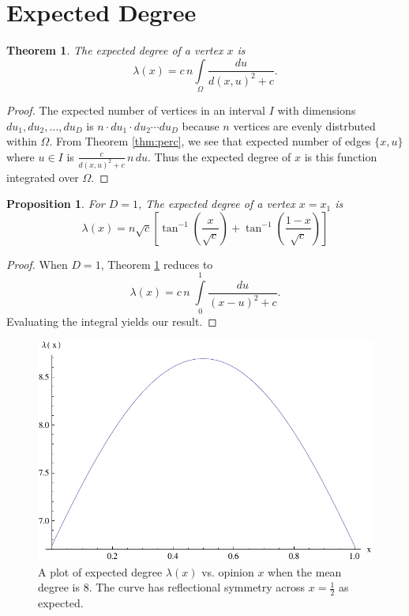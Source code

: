 \documentclass[a4paper,10pt]{article}
\newtheorem{prop}{Proposition}
\newtheorem{theorem}{Theorem}
\begin{document}
\section{Expected Degree}
\begin{theorem}
\label{thm:lambdax}
The expected degree of a vertex $x$ is
 \begin{equation}
 \lambda(x) = c\,n\int\limits_\Omega \frac{du}{d(x, u)^2 + c}.
\end{equation}
\end{theorem}
\begin{proof}
The expected number of vertices in an interval $I$ with dimensions $du_1, du_2, \ldots, du_D$  is $n \cdot du_1 \cdot du_2 \cdots du_D$ because $n$ vertices are evenly distrbuted within $\Omega$. From Theorem \ref{thm:perc}, we see that expected number of edges $\{x, u\}$ where $u \in I$ is $\frac{c}{d(x, u)^2 + c} \, n \, du$. Thus the expected degree of $x$ is this function integrated over $\Omega$.
\end{proof}

\begin{prop}
For $D = 1$, The expected degree of a vertex $x = x_1$ is
 \begin{equation}
 \lambda(x) = n\sqrt{c}\left[\tan^{-1}\left(\frac{x}{\sqrt{c}}\right)+\tan^{-1}\left(\frac{1-x}{\sqrt{c}}\right)\right]
\end{equation}
\end{prop}
\begin{proof}
When $D=1$, Theorem \ref{thm:lambdax} reduces to
\begin{equation}
 \lambda(x) = c\,n\;\int\limits_{0}^{1} \frac{du}{(x - u)^2 + c}.
\end{equation}
Evaluating the integral yields our result.
\end{proof}

\begin{figure}
 \centering
 \includegraphics[scale=.8]{images/lambdaofx.pdf}
 \caption{A plot of expected degree $\lambda(x)$ vs. opinion $x$ when the mean degree is 8. The curve has reflectional symmetry across $x = \frac{1}{2}$ as expected.}
 \label{fig:lambdaofx}
\end{figure}
\end{document}
